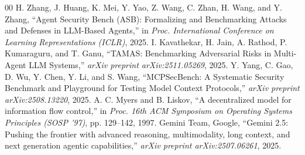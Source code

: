 \documentclass[conference,10pt]{IEEEtran}
\begin{document}
\begin{thebibliography}{00}
 H. Zhang, J. Huang, K. Mei, Y. Yao, Z. Wang, C. Zhan, H. Wang, and Y. Zhang, ``Agent Security Bench (ASB): Formalizing and Benchmarking Attacks and Defenses in LLM-Based Agents,'' in \textit{Proc. International Conference on Learning Representations (ICLR)}, 2025.
 I. Kavathekar, H. Jain, A. Rathod, P. Kumaraguru, and T. Ganu, ``TAMAS: Benchmarking Adversarial Risks in Multi-Agent LLM Systems,'' \textit{arXiv preprint arXiv:2511.05269}, 2025.
 Y. Yang, C. Gao, D. Wu, Y. Chen, Y. Li, and S. Wang, ``MCPSecBench: A Systematic Security Benchmark and Playground for Testing Model Context Protocols,'' \textit{arXiv preprint arXiv:2508.13220}, 2025.
 A. C. Myers and B. Liskov, ``A decentralized model for information flow control,'' in \textit{Proc. 16th ACM Symposium on Operating Systems Principles (SOSP '97)}, pp. 129--142, 1997.
 {Gemini Team, Google}, ``Gemini 2.5: Pushing the frontier with advanced reasoning, multimodality, long context, and next generation agentic capabilities,'' \textit{arXiv preprint arXiv:2507.06261}, 2025.
\end{thebibliography}
\end{document}
